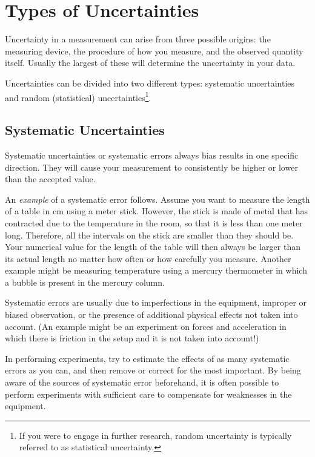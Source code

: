 \documentclass[letterpaper, 12pt]{book}
\newcommand{\myskip}{\vspace{0.5\baselineskip}}
\begin{document}
\section{Types of Uncertainties}

Uncertainty in a measurement can arise from three possible origins: the measuring device, the procedure of how you measure, and the observed quantity itself. Usually the largest of these will determine the uncertainty in your data. \myskip

Uncertainties can be divided into two different types: systematic uncertainties and random (statistical) uncertainties\footnote{If you were to engage in further research, random uncertainty is typically referred to as statistical uncertainty.}.

\subsection{Systematic Uncertainties}


Systematic uncertainties or systematic errors always bias results in one specific direction. They will cause your measurement to consistently be higher or lower than the accepted value. \myskip

An \emph{example} of a systematic error follows. Assume you want to measure the length of a table in cm using a meter stick. However, the stick is made of metal that has contracted due to the temperature in the room, so that it is less than one meter long. Therefore, all the intervals on the stick are smaller than they should be. Your numerical value for the length of the table will then always be larger than its actual length no matter how often or how carefully you measure. Another example might be measuring temperature using a mercury thermometer in which a bubble is present in the mercury column. \myskip

Systematic errors are usually due to imperfections in the equipment, improper or biased observation, or the presence of additional physical effects not taken into account. (An example might be an experiment on forces and acceleration in which there is friction in the setup and it is not taken into account!) \myskip

In performing experiments, try to estimate the effects of as many systematic errors as you can, and then remove or correct for the most important. By being aware of the sources of systematic error beforehand, it is often possible to perform experiments with sufficient care to compensate for weaknesses in the equipment.
\end{document}
